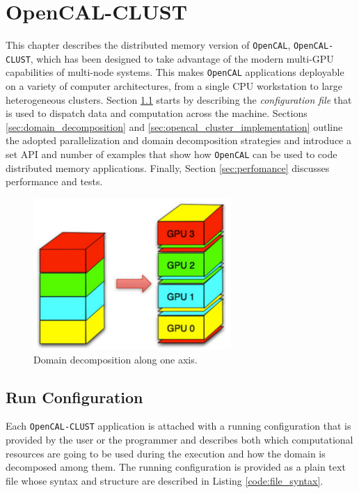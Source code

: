 \section{OpenCAL-CLUST}
This chapter describes the distributed memory version of \texttt{OpenCAL}, \texttt{OpenCAL-CLUST}, which has been designed to take advantage of the modern multi-GPU capabilities of multi-node systems. This makes \texttt{OpenCAL} applications deployable on a variety of computer architectures, from a single CPU workstation to large heterogeneous clusters. 
Section \ref{sec:run_configuration} starts by describing the \textit{configuration file} that is used to dispatch data and computation across the machine. Sections 
\ref{sec:domain_decomposition} and \ref{sec:opencal_cluster_implementation}  outline the adopted parallelization and domain decomposition strategies and introduce a set API and number of examples that show how \texttt{OpenCAL} can be used to code distributed memory applications. Finally, Section \ref{sec:perfomance} discusses performance and tests.
  \begin{figure}
    \begin{center}
        \includegraphics[width=0.67\textwidth]{./images/opencal/multigpu_domain_decomposition.png}
        \caption{Domain decomposition along one axis.}
        \label{fig:multigpu_domain_decomposition}
    \end{center}
\end{figure}



\subsection{Run Configuration}
\label{sec:run_configuration}
Each \texttt{OpenCAL-CLUST}  application is attached with a running configuration that is provided by the user or the programmer and describes both which computational resources are going to be used during the execution and how the domain is decomposed among them.
The running configuration is provided as a plain text file whose syntax and structure are described in Listing \ref{code:file_syntax}.


